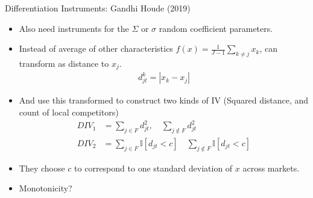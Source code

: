 \documentclass[aspectratio=169,10pt]{beamer}
\begin{document}
\begin{frame}{Differentiation Instruments: Gandhi Houde (2019)}
\begin{itemize}
\item Also need instruments for the $\Sigma$ or $\sigma$ random coefficient parameters.
\item Instead of average of other characteristics $f(x) = \frac{1}{J-1} \sum_{k \neq j} x_k$, can transform as distance to $x_j$.
\begin{align*}
d_{jt} ^k=  |x_k - x_j |
\end{align*}
\item And use this transformed to construct two kinds of IV (Squared distance, and count of local competitors)
\begin{align*}
DIV_1 &= \sum_{j \in F}  d_{jt}^2,  \quad  \sum_{j \notin F}  d_{jt}^2 \\
DIV_2 &= \sum_{j \in F}  \mathbb{I}[d_{jt} < c]   \quad \sum_{j \notin F}   \mathbb{I}[d_{jt} < c]
\end{align*}
\item They choose $c$ to correspond to one standard deviation of $x$ across markets.
\item Monotonicity?
\end{itemize}
\end{frame}


\end{document}
